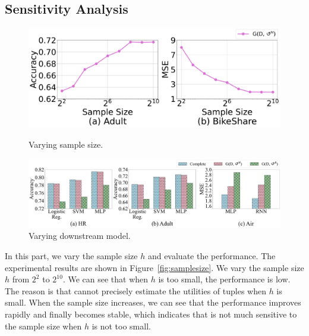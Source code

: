 \vspace{-0.5em}
\subsection{Sensitivity Analysis}
\label{exp:sec:sensitivity}

\begin{figure}[t]   
	\centering
	\begin{minipage}[t]{0.38\textwidth}
		\centering
		\includegraphics[width=\columnwidth]{figs/samplesize}
		\vspace{-2.5em}
		\caption{Varying sample size.}
		\label{fig:samplesize}
	\end{minipage}
	\begin{minipage}[t]{0.58\textwidth}
		\centering
		\includegraphics[width=\columnwidth]{figs/downstream_all}
		\vspace{-2.5em}
		\caption{Varying downstream model.}
		\label{fig:downmodel}
	\end{minipage}
	\vspace*{-1em}   
\end{figure}


 In this part, we vary the sample size $h$ and evaluate the performance. The experimental results are shown in Figure~\ref{fig:samplesize}. We vary the sample size $h$ from $2^2$ to $2^{10}$. We can see that when $h$ is too small, the performance is low. The reason is that \ours cannot precisely estimate the utilities of tuples when $h$ is  small.  When the sample size increases, we can see that the performance improves rapidly and finally becomes stable, which indicates that \ours is not much sensitive to the sample size when $h$ is not too small.

